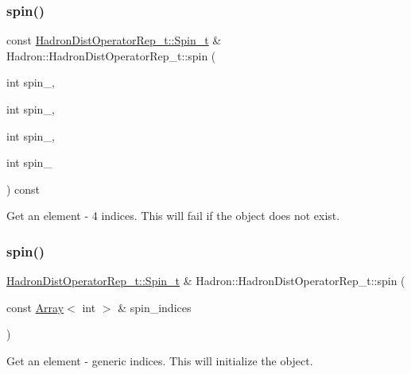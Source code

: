 \subsubsection{\texorpdfstring{spin()}{spin()}\hspace{0.1cm}{\footnotesize\ttfamily [12/16]}}
{\footnotesize\ttfamily const \mbox{\hyperlink{structHadron_1_1HadronDistOperatorRep__t_1_1Spin__t}{Hadron\+Dist\+Operator\+Rep\+\_\+t\+::\+Spin\+\_\+t}} \& Hadron\+::\+Hadron\+Dist\+Operator\+Rep\+\_\+t\+::spin (\begin{DoxyParamCaption}\item[{int}]{spin\+\_,  }\item[{int}]{spin\+\_,  }\item[{int}]{spin\+\_,  }\item[{int}]{spin\+\_ }\end{DoxyParamCaption}) const}



Get an element -\/ 4 indices. This will fail if the object does not exist. 

\mbox{\label{classHadron_1_1HadronDistOperatorRep__t_ad889e6377702e72419f259860142225f}} 
\subsubsection{\texorpdfstring{spin()}{spin()}\hspace{0.1cm}{\footnotesize\ttfamily [13/16]}}
{\footnotesize\ttfamily \mbox{\hyperlink{structHadron_1_1HadronDistOperatorRep__t_1_1Spin__t}{Hadron\+Dist\+Operator\+Rep\+\_\+t\+::\+Spin\+\_\+t}} \& Hadron\+::\+Hadron\+Dist\+Operator\+Rep\+\_\+t\+::spin (\begin{DoxyParamCaption}\item[{const \mbox{\hyperlink{classXMLArray_1_1Array}{Array}}$<$ int $>$ \&}]{spin\+\_\+indices }\end{DoxyParamCaption})}



Get an element -\/ generic indices. This will initialize the object. 

